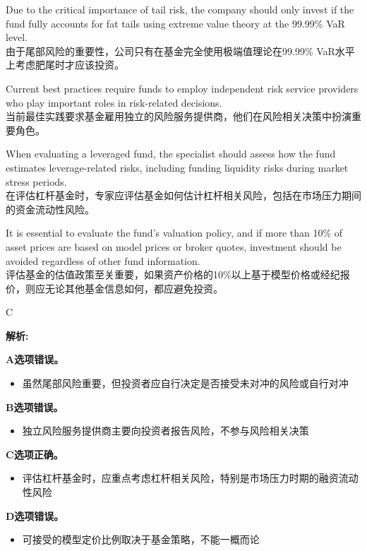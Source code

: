 \documentclass{article}
\newenvironment{explanation}
{\textbf{解析:}\par}
{\par}
\begin{document}
\begin{choices}
    \item Due to the critical importance of tail risk, the company should only invest if the fund fully accounts for fat tails using extreme value theory at the 99.99\% VaR level.\\由于尾部风险的重要性，公司只有在基金完全使用极端值理论在99.99\% VaR水平上考虑肥尾时才应该投资。
    \item Current best practices require funds to employ independent risk service providers who play important roles in risk-related decisions.\\当前最佳实践要求基金雇用独立的风险服务提供商，他们在风险相关决策中扮演重要角色。
    \item When evaluating a leveraged fund, the specialist should assess how the fund estimates leverage-related risks, including funding liquidity risks during market stress periods.\\在评估杠杆基金时，专家应评估基金如何估计杠杆相关风险，包括在市场压力期间的资金流动性风险。
    \item It is essential to evaluate the fund's valuation policy, and if more than 10\% of asset prices are based on model prices or broker quotes, investment should be avoided regardless of other fund information.\\评估基金的估值政策至关重要，如果资产价格的10\%以上基于模型价格或经纪报价，则应无论其他基金信息如何，都应避免投资。
\end{choices}

\begin{correctanswer}
    C
\end{correctanswer}

\begin{explanation}
    \textbf{A选项错误。}
    \begin{itemize}
        \item 虽然尾部风险重要，但投资者应自行决定是否接受未对冲的风险或自行对冲
    \end{itemize}
    
    \textbf{B选项错误。}
    \begin{itemize}
        \item 独立风险服务提供商主要向投资者报告风险，不参与风险相关决策
    \end{itemize}
    
    \textbf{C选项正确。}
    \begin{itemize}
        \item 评估杠杆基金时，应重点考虑杠杆相关风险，特别是市场压力时期的融资流动性风险
    \end{itemize}
    
    \textbf{D选项错误。}
    \begin{itemize}
        \item 可接受的模型定价比例取决于基金策略，不能一概而论
    \end{itemize}
\end{explanation}
\end{document}
